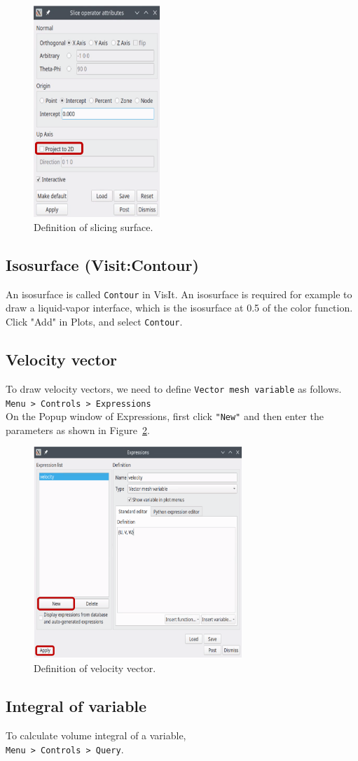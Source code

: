 \begin{figure}[ht]
	\centering
	\setlength{\unitlength}{1mm}
	\includegraphics[height=8cm]{Figures/10-01-visit-slice.png}
	\caption{Definition of slicing surface.} 
	\label{fig_visit_slice}
\end{figure}

\subsection{Isosurface (Visit:Contour)}
An isosurface is called {\tt Contour} in VisIt. An isosurface is required for example to draw a liquid-vapor interface, which is the isosurface at 0.5 of the color function. Click "Add" in Plots, and select {\tt Contour}.


\subsection{Velocity vector}
To draw velocity vectors, we need to define {\tt Vector mesh variable} as follows. \\
{\tt Menu > Controls > Expressions}\\
On the Popup window of Expressions, first click {\tt "New"} and then enter the parameters as shown in Figure~\ref{fig_visit_vector}.

\begin{figure}[ht]
	\centering
	\includegraphics[height=8cm]{Figures/10-01-visit-vector.png}
	\caption{Definition of velocity vector.} 
	\label{fig_visit_vector}
\end{figure}

\subsection{Integral of variable}
To calculate volume integral of a variable,\\
{\tt Menu > Controls > Query}.
